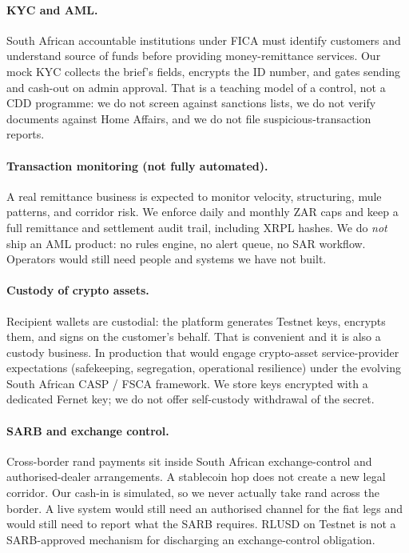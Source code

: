 \documentclass[11pt]{article}
\begin{document}
\paragraph{KYC and AML.}
South African accountable institutions under FICA must identify customers and understand source of funds before providing money-remittance services. Our mock KYC collects the brief's fields, encrypts the ID number, and gates sending and cash-out on admin approval. That is a teaching model of a control, not a CDD programme: we do not screen against sanctions lists, we do not verify documents against Home Affairs, and we do not file suspicious-transaction reports.

\paragraph{Transaction monitoring (not fully automated).}
A real remittance business is expected to monitor velocity, structuring, mule patterns, and corridor risk. We enforce daily and monthly ZAR caps and keep a full remittance and settlement audit trail, including XRPL hashes. We do \emph{not} ship an AML product: no rules engine, no alert queue, no SAR workflow. Operators would still need people and systems we have not built.

\paragraph{Custody of crypto assets.}
Recipient wallets are custodial: the platform generates Testnet keys, encrypts them, and signs on the customer's behalf. That is convenient and it is also a custody business. In production that would engage crypto-asset service-provider expectations (safekeeping, segregation, operational resilience) under the evolving South African CASP / FSCA framework. We store keys encrypted with a dedicated Fernet key; we do not offer self-custody withdrawal of the secret.

\paragraph{SARB and exchange control.}
Cross-border rand payments sit inside South African exchange-control and authorised-dealer arrangements. A stablecoin hop does not create a new legal corridor. Our cash-in is simulated, so we never actually take rand across the border. A live system would still need an authorised channel for the fiat legs and would still need to report what the SARB requires. RLUSD on Testnet is not a SARB-approved mechanism for discharging an exchange-control obligation.
\end{document}
